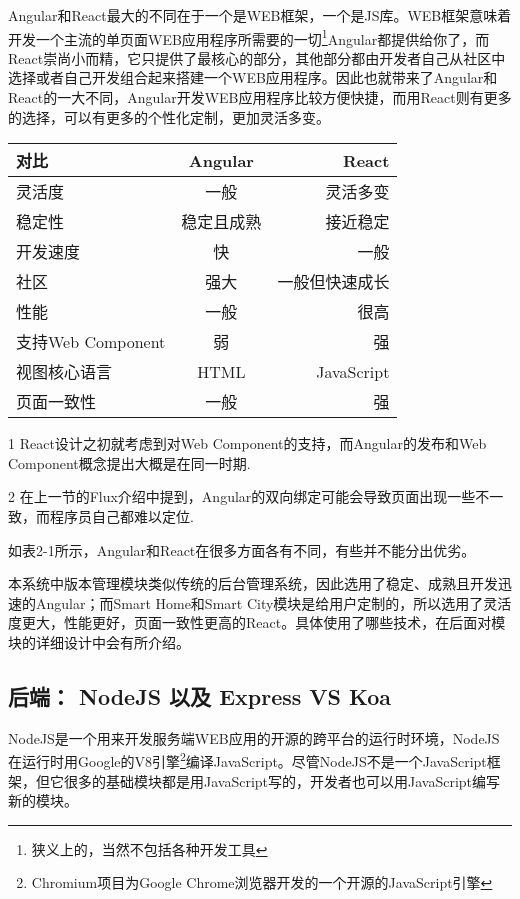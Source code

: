 Angular和React最大的不同在于一个是WEB框架，一个是JS库。WEB框架意味着开发一个主流的单页面WEB应用程序所需要的一切\footnote{狭义上的，当然不包括各种开发工具}Angular都提供给你了，而React崇尚小而精，它只提供了最核心的部分，其他部分都由开发者自己从社区中选择或者自己开发组合起来搭建一个WEB应用程序。因此也就带来了Angular和React的一大不同，Angular开发WEB应用程序比较方便快捷，而用React则有更多的选择，可以有更多的个性化定制，更加灵活多变。

\begin{table}[!htpb]
  \centering
  \begin{threeparttable}[b]
    \begin{tabular}{lcr}
      \toprule
      对比 & Angular & React \\
      \midrule
      灵活度 & 一般  & 灵活多变 \\
      稳定性 & 稳定且成熟  & 接近稳定 \\
      开发速度 & 快 & 一般\\
      社区 & 强大 & 一般但快速成长 \\
      性能 & 一般 & 很高 \\
      支持Web Component\tnote{1} & 弱 & 强 \\
      视图核心语言 & HTML & JavaScript \\
      页面一致性\tnote{2} & 一般 & 强 \\
      \bottomrule
    \end{tabular}
    \begin{tablenotes}
    \item [1] React设计之初就考虑到对Web Component的支持，而Angular的发布和Web Component概念提出大概是在同一时期.
    \item [2] 在上一节的Flux介绍中提到，Angular的双向绑定可能会导致页面出现一些不一致，而程序员自己都难以定位.
    \end{tablenotes}
  \end{threeparttable}
\end{table}

如表2-1所示，Angular和React在很多方面各有不同，有些并不能分出优劣。

本系统中版本管理模块类似传统的后台管理系统，因此选用了稳定、成熟且开发迅速的Angular；而Smart Home和Smart City模块是给用户定制的，所以选用了灵活度更大，性能更好，页面一致性更高的React。具体使用了哪些技术，在后面对模块的详细设计中会有所介绍。

\subsection{后端： NodeJS 以及 Express VS Koa}
NodeJS是一个用来开发服务端WEB应用的开源的跨平台的运行时环境，NodeJS在运行时用Google的V8引擎\footnote{Chromium项目为Google Chrome浏览器开发的一个开源的JavaScript引擎}编译JavaScript。尽管NodeJS不是一个JavaScript框架，但它很多的基础模块都是用JavaScript写的，开发者也可以用JavaScript编写新的模块。

